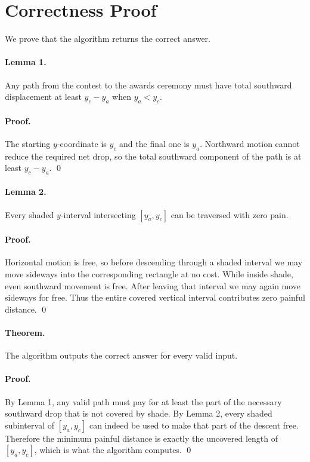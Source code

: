 \documentclass[11pt]{article}
\begin{document}
\section*{Correctness Proof}

We prove that the algorithm returns the correct answer.

\paragraph{Lemma 1.}
Any path from the contest to the awards ceremony must have total southward displacement at least
$y_c-y_a$ when $y_a < y_c$.

\paragraph{Proof.}
The starting $y$-coordinate is $y_c$ and the final one is $y_a$.
Northward motion cannot reduce the required net drop, so the total southward component of the path is at
least $y_c-y_a$. \qed

\paragraph{Lemma 2.}
Every shaded $y$-interval intersecting $[y_a,y_c]$ can be traversed with zero pain.

\paragraph{Proof.}
Horizontal motion is free, so before descending through a shaded interval we may move sideways into the
corresponding rectangle at no cost. While inside shade, even southward movement is free. After leaving
that interval we may again move sideways for free. Thus the entire covered vertical interval contributes
zero painful distance. \qed

\paragraph{Theorem.}
The algorithm outputs the correct answer for every valid input.

\paragraph{Proof.}
By Lemma 1, any valid path must pay for at least the part of the necessary southward drop that is not
covered by shade. By Lemma 2, every shaded subinterval of $[y_a,y_c]$ can indeed be used to make that
part of the descent free. Therefore the minimum painful distance is exactly the uncovered length of
$[y_a,y_c]$, which is what the algorithm computes. \qed
\end{document}
